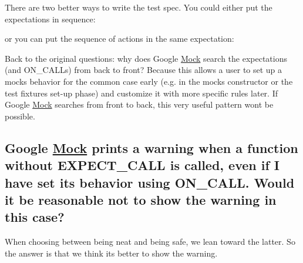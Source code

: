 There are two better ways to write the test spec. You could either put the expectations in sequence\+:


\begin{DoxyCode}{0}
\DoxyCodeLine{\{}
\DoxyCodeLine{\}}
\end{DoxyCode}


or you can put the sequence of actions in the same expectation\+:


\begin{DoxyCode}{0}
\end{DoxyCode}


Back to the original questions\+: why does Google \mbox{\hyperlink{class_mock}{Mock}} search the expectations (and {\ttfamily O\+N\+\_\+\+C\+A\+LL}s) from back to front? Because this allows a user to set up a mock\textquotesingle{}s behavior for the common case early (e.\+g. in the mock\textquotesingle{}s constructor or the test fixture\textquotesingle{}s set-\/up phase) and customize it with more specific rules later. If Google \mbox{\hyperlink{class_mock}{Mock}} searches from front to back, this very useful pattern won\textquotesingle{}t be possible.

\subsection*{Google \mbox{\hyperlink{class_mock}{Mock}} prints a warning when a function without E\+X\+P\+E\+C\+T\+\_\+\+C\+A\+LL is called, even if I have set its behavior using O\+N\+\_\+\+C\+A\+LL. Would it be reasonable not to show the warning in this case?}

When choosing between being neat and being safe, we lean toward the latter. So the answer is that we think it\textquotesingle{}s better to show the warning.

